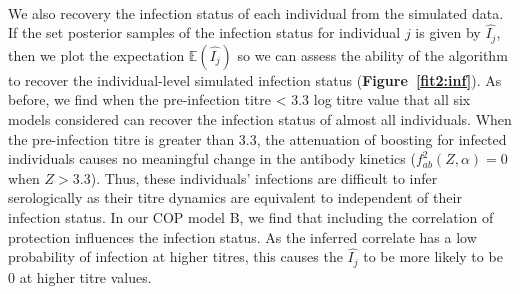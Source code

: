 \documentclass{article}
\begin{document}
\paragraph{}We also recovery the infection status of each individual from the simulated data. If the set posterior samples of the infection status for individual $j$ is given by $\hat{I_j} $, then we plot the expectation $\mathbb{E}(\hat{I_j} )$ so we can assess the ability of the algorithm to recover the individual-level simulated infection status (\textbf{Figure~\ref{fit2:inf}}). As before, we find when the pre-infection titre < 3.3 log titre value that all six models considered can recover the infection status of almost all individuals. When the pre-infection titre is greater than 3.3, the attenuation of boosting for infected individuals causes no meaningful change in the antibody kinetics ($f^2_{ab}(Z, \alpha) = 0$ when $Z > 3.3$). Thus, these individuals' infections are difficult to infer serologically as their titre dynamics are equivalent to independent of their infection status. In our COP model B, we find that including the correlation of protection influences the infection status. As the inferred correlate has a low probability of infection at higher titres, this causes the $\hat{I_j}$ to be more likely to be 0 at higher titre values. 
\end{document}
